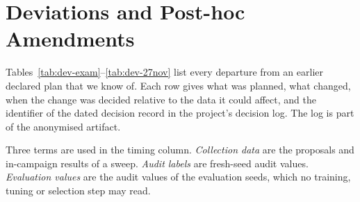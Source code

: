 \section{Deviations and Post-hoc Amendments}
\label{app:deviations}

Tables~\ref{tab:dev-exam}--\ref{tab:dev-27nov} list every departure from an earlier declared plan that we know of. Each row gives what was planned, what changed, when the change was decided relative to the data it could affect, and the identifier of the dated decision record in the project's decision log. The log is part of the anonymised artifact. 

Three terms are used in the timing column. \emph{Collection data} are the proposals and in-campaign results of a sweep. \emph{Audit labels} are fresh-seed audit values. \emph{Evaluation values} are the audit values of the evaluation seeds, which no training, tuning or selection step may read.

